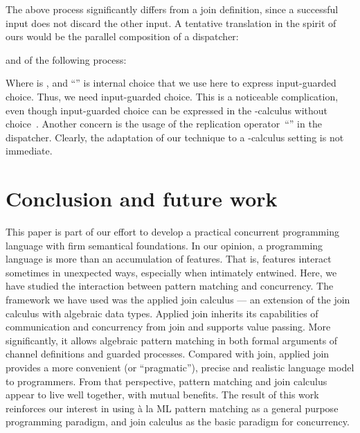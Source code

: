\documentclass{LMCS}
\renewcommand{\_}{\mathord{\rule[-.25ex]{1ex}{.15ex}}}
\begin{document}
The above process significantly differs from a join definition, since
a successful input does not discard the other input.
A tentative translation in the spirit of ours would
be the parallel composition of a dispatcher:

and of the following process:

Where  is ,
and ``'' is internal choice that we use here to express input-guarded choice.
Thus, we need input-guarded choice.
This is a noticeable complication, even though
input-guarded choice can be expressed
in the -calculus without choice~\cite{NestmannPierce00}.
Another concern is the usage of the replication operator~``''
in the dispatcher.
Clearly, the adaptation of our technique to a -calculus setting
is not immediate.


\section{Conclusion and future work}
\label{sec.conclusion}

This paper is part of our effort to develop a practical concurrent
programming language with firm semantical foundations.
In our opinion, a programming language is more
than an accumulation of features. That is, features interact sometimes
in unexpected ways, especially when intimately entwined.  Here, we
have studied the interaction between pattern matching and concurrency.
The framework we have used was the applied join calculus --- an
extension of the join calculus with algebraic data types. Applied join
inherits its capabilities of communication and concurrency from join
and supports value passing.  More significantly, it allows algebraic
pattern matching in both formal arguments of channel definitions and
guarded processes.  Compared with join, applied join provides a more
convenient (or ``pragmatic''), precise and realistic language model to
programmers.  From that perspective, pattern matching and join
calculus appear to live well together, with mutual benefits. The
result of this work reinforces our interest in using \`{a} la ML
pattern matching as a general purpose programming paradigm, and join
calculus as the basic paradigm for concurrency.
\end{document}
